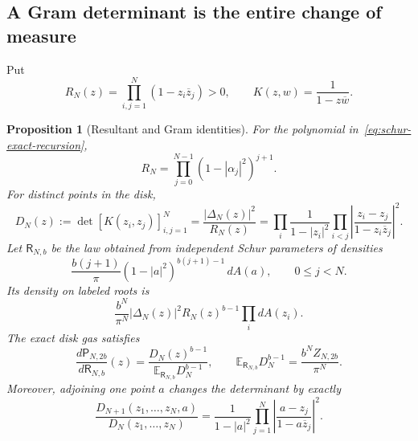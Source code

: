 \documentclass[11pt,a4paper]{article}
\numberwithin{equation}{section}
\newtheorem{proposition}[theorem]{Proposition}
\theoremstyle{definition}
\theoremstyle{remark}
\begin{document}
\subsection{A Gram determinant is the entire change of measure}
Put
\[
 R_N(z)=\prod_{i,j=1}^N(1-z_i\overline z_j)>0,\qquad
 K(z,w)=\frac{1}{1-z\overline w}.
\]

\begin{proposition}[Resultant and Gram identities]
\label{prop:schur-gram-identity}
For the polynomial in~\eqref{eq:schur-exact-recursion},
\begin{equation}
 R_N=\prod_{j=0}^{N-1}(1-|\alpha_j|^2)^{j+1}.
 \label{eq:schur-resultant-product}
\end{equation}
For distinct points in the disk,
\begin{equation}
 D_N(z):=\det[K(z_i,z_j)]_{i,j=1}^N
 =\frac{|\Delta_N(z)|^2}{R_N(z)}
 =\prod_i\frac{1}{1-|z_i|^2}
  \prod_{i<j}\left|\frac{z_i-z_j}{1-z_i\overline z_j}\right|^2.
 \label{eq:schur-szego-gram}
\end{equation}
Let $\mathsf R_{N,b}$ be the law obtained from independent Schur
parameters of densities
\begin{equation}
 \frac{b(j+1)}{\pi}(1-|a|^2)^{b(j+1)-1}\,dA(a),
 \qquad 0\le j<N.
 \label{eq:schur-reference-parameters}
\end{equation}
Its density on labeled roots is
\begin{equation}
 \frac{b^N}{\pi^N}|\Delta_N(z)|^2R_N(z)^{b-1}\prod_i dA(z_i).
 \label{eq:schur-reference-roots}
\end{equation}
The exact disk gas satisfies
\begin{equation}
 \frac{d\mathsf P_{N,2b}}{d\mathsf R_{N,b}}(z)
 =\frac{D_N(z)^{b-1}}{\mathbb E_{\mathsf R_{N,b}}D_N^{b-1}},
 \qquad
 \mathbb E_{\mathsf R_{N,b}}D_N^{b-1}
 =\frac{b^NZ_{N,2b}}{\pi^N}.
 \label{eq:schur-gram-change-measure}
\end{equation}
Moreover, adjoining one point $a$ changes the determinant by exactly
\begin{equation}
 \frac{D_{N+1}(z_1,\ldots,z_N,a)}{D_N(z_1,\ldots,z_N)}
 =\frac{1}{1-|a|^2}
   \prod_{j=1}^N\left|\frac{a-z_j}{1-a\overline z_j}\right|^2.
 \label{eq:schur-gram-insertion}
\end{equation}
\end{proposition}
\end{document}
